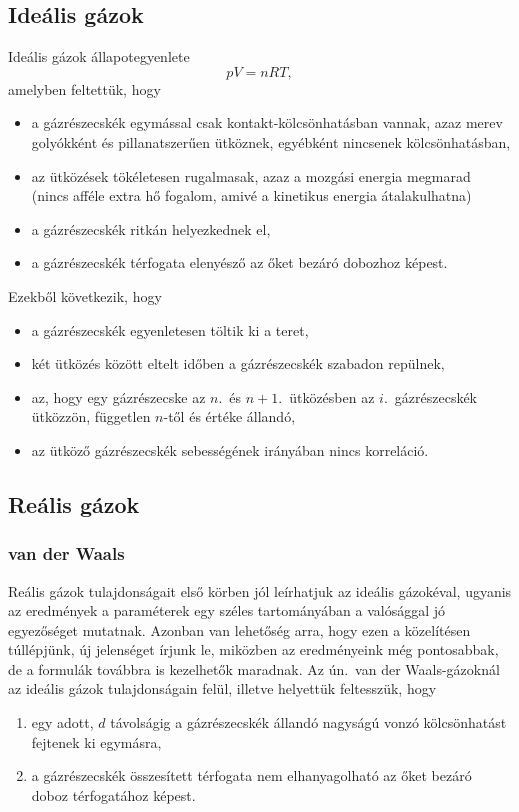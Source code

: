 \documentclass[12pt,a4paper]{scrartcl}
\begin{document}
\subsection{Ideális gázok}
Ideális gázok állapotegyenlete
\begin{equation} \label{eq:idealisGaz}
pV = nRT,
\end{equation}
amelyben feltettük, hogy
\begin{itemize}
\item a gázrészecskék egymással csak kontakt-kölcsönhatásban vannak, azaz merev golyókként és pillanatszerűen ütköznek, egyébként nincsenek kölcsönhatásban,
\item az ütközések tökéletesen rugalmasak, azaz a mozgási energia megmarad (nincs afféle extra hő fogalom, amivé a kinetikus energia átalakulhatna)
\item a gázrészecskék ritkán helyezkednek el,
\item a gázrészecskék térfogata elenyésző az őket bezáró dobozhoz képest.
\end{itemize}
Ezekből következik, hogy
\begin{itemize}
\item a gázrészecskék egyenletesen töltik ki a teret,
\item két ütközés között eltelt időben a gázrészecskék szabadon repülnek,
\item az, hogy egy gázrészecske az $n$.\ és $n+1$.\ ütközésben az $i$.\ gázrészecskék ütközzön, független $n$-től és értéke állandó,
\item az ütköző gázrészecskék sebességének irányában nincs korreláció.
\end{itemize}
\subsection{Reális gázok}
\subsubsection{van der Waals}
Reális gázok tulajdonságait első körben jól leírhatjuk az ideális gázokéval, ugyanis az eredmények a paraméterek egy széles tartományában a valósággal jó egyezőséget mutatnak. Azonban van lehetőség arra, hogy ezen a közelítésen túllépjünk, új jelenséget írjunk le, miközben az eredményeink még pontosabbak, de a formulák továbbra is kezelhetők maradnak. Az ún.\ van der Waals-gázoknál az ideális gázok tulajdonságain felül, illetve helyettük feltesszük, hogy
\begin{enumerate}
\item egy adott, $d$ távolságig a gázrészecskék állandó nagyságú vonzó kölcsönhatást fejtenek ki egymásra,
\item a gázrészecskék összesített térfogata nem elhanyagolható az őket bezáró doboz térfogatához képest.
\end{enumerate}
\end{document}
